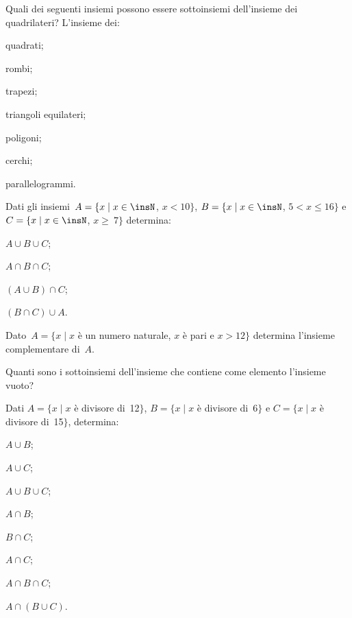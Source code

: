 \begin{esercizio}
Quali dei seguenti insiemi possono essere sottoinsiemi dell'insieme dei quadrilateri?
L'insieme dei:
\begin{multicols}{3}
\begin{enumeratea}
 \item quadrati;
 \item rombi;
 \item trapezi;
 \item triangoli equilateri;
 \item poligoni;
 \item cerchi;
 \item parallelogrammi.
\end{enumeratea}
\end{multicols}
\end{esercizio}


\begin{esercizio}
Dati gli insiemi~$A=\{x\mid x\in\insN$, $x<10\}$, $B=\{x\mid x\in\insN$, $5<x\le 16\}$ e
$C=\{x\mid x\in\insN$, $x\ge~7\}$ determina:
\begin{multicols}{4}
\begin{enumeratea}
\item $A\cup B\cup C$;
\item $A\cap B\cap C$;
\item $(A\cup B)\cap C$;
\item $(B\cap C)\cup A$.
\end{enumeratea}
\end{multicols}
\end{esercizio}


\begin{esercizio}
Dato~$A = \{x\mid x$ è un numero naturale, $x$ è pari e $x>12\}$ determina l'insieme complementare di~$A$.
\end{esercizio}

\begin{esercizio}
Quanti sono i sottoinsiemi dell'insieme che contiene come elemento
l'insieme vuoto?
\end{esercizio}

\begin{esercizio}
Dati $A=\{x\mid x$ è divisore di~12$\}$, $B=\{x\mid x$ è divisore di~6$\}$ e
$C=\{x\mid x$ è divisore di~15$\}$, determina:
\begin{multicols}{4}
 \begin{enumeratea}
 \item $A\cup B$;
 \item $A\cup C$;
 \item $A\cup B\cup C$;
 \item $A\cap B$;
 \item $B\cap C$;
 \item $A\cap C$;
 \item $A\cap B\cap C$;
 \item $A\cap(B\cup C)$.
 \end{enumeratea}
\end{multicols}
\end{esercizio}


